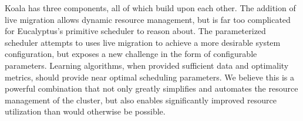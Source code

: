Koala has three components, all of which build upon each other.  The addition
of live migration allows dynamic resource management, but is far too
complicated for Eucalyptus's primitive scheduler to reason about.  The
parameterized scheduler attempts to uses live migration to achieve a more
desirable system configuration, but exposes a new challenge in the form of
configurable parameters.  Learning algorithms, when provided sufficient data
and optimality metrics, should provide near optimal scheduling parameters.  We
believe this is a powerful combination that not only greatly simplifies and
automates the resource management of the cluster, but also enables
significantly improved resource utilization than would otherwise be possible.
